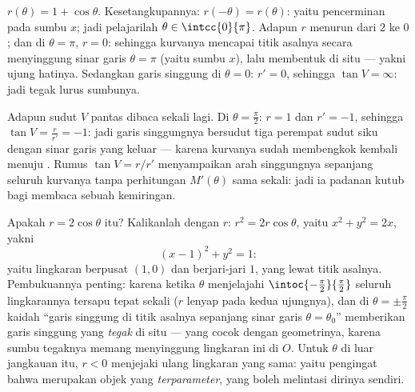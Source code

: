 \begin{example}[Kardioid]\label{ex:b1:curves:cardioid}
$r(\theta) = 1 + \cos\theta$. Kesetangkupannya: $r(-\theta)
= r(\theta)$: yaitu pencerminan pada sumbu $x$; jadi pelajarilah $\theta \in
\intcc{0}{\pi}$. Adapun $r$ menurun dari $2$ ke $0$; dan di $\theta = \pi$,
$r = 0$: sehingga kurvanya mencapai titik asalnya secara menyinggung sinar garis
$\theta = \pi$ (yaitu sumbu $x$), lalu membentuk  di situ --- yakni ujung
hatinya. Sedangkan garis singgung di $\theta = 0$: $r' = 0$, sehingga $\tan V = \infty$:
jadi tegak lurus sumbunya.

Adapun sudut $V$ pantas dibaca sekali lagi. Di $\theta =
\frac\pi2$: $r = 1$ dan $r' = -1$, sehingga $\tan V = \frac{r}{r'} =
-1$: jadi garis singgungnya bersudut tiga perempat sudut siku dengan
sinar garis yang keluar --- karena kurvanya sudah membengkok kembali menuju
. Rumus $\tan V = r/r'$ menyampaikan arah singgungnya
sepanjang seluruh kurvanya tanpa perhitungan $M'(\theta)$
sama sekali: jadi ia padanan kutub bagi membaca sebuah kemiringan.
\end{example}

\begin{example}
\label{ex:b1:curves:polarcircle}
Apakah  $r = 2\cos\theta$ itu? Kalikanlah dengan $r$:
$r^2 = 2r\cos\theta$, yaitu $x^2 + y^2 = 2x$, yakni
\[
(x - 1)^2 + y^2 = 1 :
\]
yaitu lingkaran berpusat $(1, 0)$ dan berjari-jari $1$, yang lewat
titik asalnya. Pembukuannya penting: karena ketika $\theta$ menjelajahi
$\intoc{-\frac\pi2}{\frac\pi2}$ seluruh lingkarannya tersapu
tepat sekali ($r$ lenyap pada kedua ujungnya), dan di $\theta =
\pm\frac\pi2$ kaidah ``garis singgung di titik asalnya sepanjang sinar garis
$\theta = \theta_0$'' memberikan garis singgung yang \emph{tegak} di situ ---
yang cocok dengan geometrinya, karena sumbu tegaknya memang menyinggung
lingkaran ini di $O$. Untuk $\theta$ di luar jangkauan itu, $r < 0$
menjejaki ulang lingkaran yang sama: yaitu pengingat bahwa  merupakan
objek yang \emph{terparameter}, yang boleh melintasi dirinya sendiri.
\end{example}

